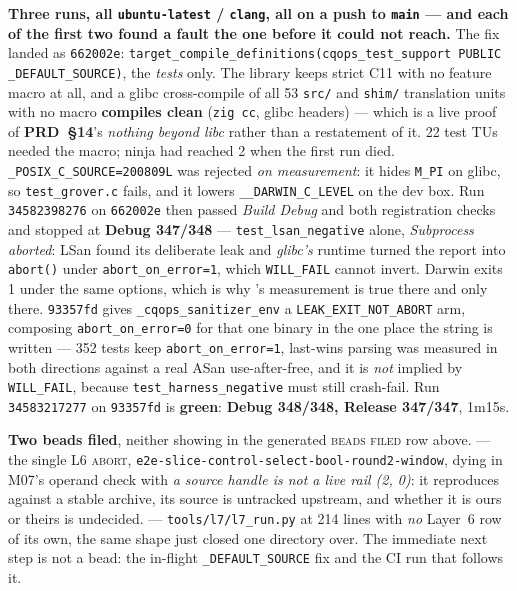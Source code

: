 \medskip
\noindent\textbf{Three runs, all \texttt{ubuntu-latest} / \texttt{clang}, all on
a push to \texttt{main} --- and each of the first two found a fault the one
before it could not reach.} The fix landed as \texttt{662002e}:
\texttt{target\_compile\_definitions(cqops\_test\_support PUBLIC
\_DEFAULT\_SOURCE)}, the \emph{tests} only. The library keeps strict C11 with no
feature macro at all, and a glibc cross-compile of all 53 \texttt{src/} and
\texttt{shim/} translation units with no macro \textbf{compiles clean}
(\texttt{zig cc}, glibc headers) --- which is a live proof of \textbf{PRD~§14}'s
\emph{nothing beyond libc} rather than a restatement of it. 22 test TUs needed
the macro; ninja had reached 2 when the first run died.
\texttt{\_POSIX\_C\_SOURCE=200809L} was rejected \emph{on measurement}: it hides
\texttt{M\_PI} on glibc, so \texttt{test\_grover.c} fails, and it lowers
\texttt{\_\_DARWIN\_C\_LEVEL} on the dev box. Run \texttt{34582398276} on
\texttt{662002e} then passed \emph{Build Debug} and both registration checks and
stopped at \textbf{Debug 347/348} --- \texttt{test\_lsan\_negative} alone,
\emph{Subprocess aborted}: LSan found its deliberate leak and \emph{glibc's}
runtime turned the report into \texttt{abort()} under
\texttt{abort\_on\_error=1}, which \texttt{WILL\_FAIL} cannot invert. Darwin
exits 1 under the same options, which is why 's measurement is true
there and only there. \texttt{93357fd} gives \texttt{\_cqops\_sanitizer\_env} a
\texttt{LEAK\_EXIT\_NOT\_ABORT} arm, composing \texttt{abort\_on\_error=0} for
that one binary in the one place the string is written --- 352 tests keep
\texttt{abort\_on\_error=1}, last-wins parsing was measured in both directions
against a real ASan use-after-free, and it is \emph{not} implied by
\texttt{WILL\_FAIL}, because \texttt{test\_harness\_negative} must still
crash-fail. Run \texttt{34583217277} on \texttt{93357fd} is \textbf{green}:
\textbf{Debug 348/348, Release 347/347}, 1m15s.

\textbf{Two beads filed}, neither showing in the generated \textsc{beads filed}
row above.  --- the single L6 \textsc{abort},
\texttt{e2e-slice-control-select-bool-round2-window}, dying in M07's operand
check with \emph{a source handle is not a live rail (2, 0)}: it reproduces
against a stable archive, its source is untracked upstream, and whether it is
ours or theirs is undecided.  --- \texttt{tools/l7/l7\_run.py} at 214
lines with \emph{no} Layer~6 row of its own, the same shape  just
closed one directory over. The immediate next step is not a bead: the in-flight
\texttt{\_DEFAULT\_SOURCE} fix and the CI run that follows it.
